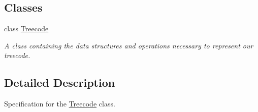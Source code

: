 \subsection*{Classes}
\begin{DoxyCompactItemize}
\item 
class \hyperlink{classTreecode}{Treecode}
\begin{DoxyCompactList}\small\item\em A class containing the data structures and operations necessary to represent our treecode. \end{DoxyCompactList}\end{DoxyCompactItemize}


\subsection{Detailed Description}
Specification for the \hyperlink{classTreecode}{Treecode} class. 

